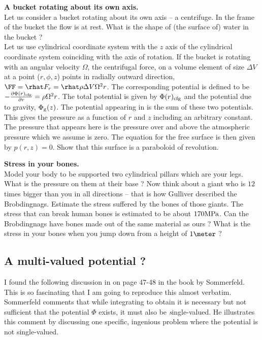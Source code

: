 \begin{Exercise}
\Question
\label{prb2.1}
{\bf A bucket rotating about its own axis.}\\
Let us consider a bucket rotating about its own axis -- a
centrifuge. In the frame of the bucket the flow is at rest. What is
the shape of (the surface of) water in the bucket ? \\
Let us use cylindrical coordinate system with the $z$ axis of the
cylindrical coordinate system coinciding with the axis of rotation. 
If the bucket is rotating with an angular velocity $\Omega$, the
centrifugal force, on a volume element of size $\Delta V$ at a 
point ($r,\phi,z$) points in radially outward direction, 
$\FF = \rhat F_{r} = \rhat \rho\Delta V \Omega^2r$. The corresponding
potential is defined to be 
$-\frac{\partial\Phi(r)_{\rm cfg}}{\partial r} =   \rho\Omega^2r$.
The total potential is given by $\Phi(r)_{\rm cfg}$ and the potential
due to gravity, $\Phi_{\rm g}(z)$. The potential appearing in  
  is the sum of these two potentials.  This gives the
 pressure as a function of $r$ and $z$ including an arbitrary
 constant. The pressure that appears here is the pressure over and
 above the atmospheric pressure which we assume is zero. The equation
 for the free surface is then given by $p(r,z) = 0$. Show that this
 surface is a paraboloid of revolution. 

% 
\Question
{\bf Stress in your bones.} \\
Model your body to be supported two cylindrical pillars which are your
legs. What is the pressure on them at their base ? Now think about a
giant who is $12$ times bigger than you in all directions -- that is
how Gulliver described the Brobdingnags. Estimate the stress suffered
by the bones of those giants. The stress that can break human bones is
estimated to be about $170 {\rm M Pa}$. Can the Brobdingnags have
bones made out of the same material as ours ? What is the stress in
your bones when you jump down from a height of $1\meter$ ?  
\end{Exercise}
\subsection{A multi-valued potential ?}
\label{sec:multi}
I found the following discussion in on page 47-48 in the book by
Sommerfeld\cite{SomII06}. This is so fascinating that I am
going to reproduce this almost verbatim. 
Sommerfeld comments that while integrating 
to obtain  it is necessary but not sufficient that the potential $\Phi$
exists, it must also be {\textit single-valued}. He illustrates this
comment by discussing one specific, ingenious problem where the potential is not
single-valued. 

